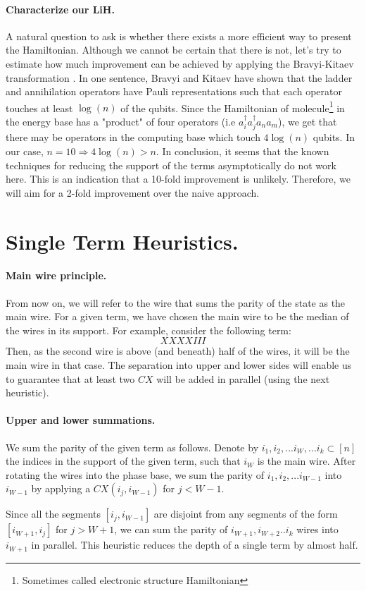 \documentclass{article}
\begin{document}
\begin{multicols}{2}
\paragraph{Characterize our \textbf{LiH}.} A natural question to ask is whether there exists a more efficient way to present the Hamiltonian. Although we cannot be certain that there is not, let's try to estimate how much improvement can be achieved by applying the Bravyi-Kitaev transformation \cite{Bravyi_2002} . In one sentence, Bravyi and Kitaev have shown that the ladder and annihilation operators have Pauli representations such that each operator touches at least \( \log\left(n\right) \) of the qubits. Since the Hamiltonian of molecule\footnote{Sometimes called electronic structure Hamiltonian} in the energy base has a "product" of four operators (i.e \( a^{\dagger}_{i}a^{\dagger}_{j}a_{n}a_{m} \)), we get that there may be operators in the computing base which touch \(4\log\left(n\right)\) qubits. In our case, \(n = 10 \Rightarrow 4\log\left(n\right) > n \). 
In conclusion, it seems that the known techniques for reducing the support of the terms asymptotically do not work here. This is an indication that a 10-fold improvement is unlikely. Therefore, we will aim for a 2-fold improvement over the naive approach.
\section{Single Term Heuristics.}

\paragraph{Main wire principle.} 
From now on, we will refer to the wire that sums the parity of the state as the main wire. For a given term, we have chosen the main wire to be the median of the wires in its support. For example, consider the following term:
\begin{equation*}
    XXXXIII
\end{equation*} 
Then, as the second wire is above (and beneath) half of the wires, it will be the main wire in that case. The separation into upper and lower sides will enable us to guarantee that at least two \(CX\) will be added in parallel (using the next heuristic).
\paragraph{Upper and lower summations.} We sum the parity of the given term as follows. Denote by \(i_{1}, i_{2}, ... i_{W}, ... i_{k} \subset [n]\) the indices in the support of the given term, such that \(i_{W}\) is the main wire. After rotating the wires into the phase base, we sum the parity of \(i_{1}, i_{2}, ... i_{W-1}\) into \(i_{W-1}\) by applying a \(CX\left(i_{j}, i_{W-1}\right)\) for \(j < W-1\). 

Since all the segments \([i_{j}, i_{W-1}]\) are disjoint from any segments of the form  \([i_{W+1}, i_{j}]\) for \(j > W+1\), we can sum the parity of \(i_{W+1},   i_{W+2} .. i_{k}\) wires into \(i_{W+1}\) in parallel. This heuristic reduces the depth of a single term by almost half.
\end{multicols}
\end{document}
